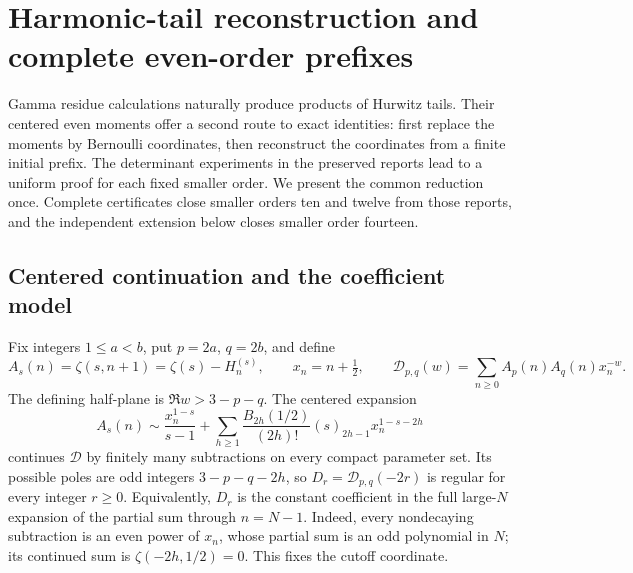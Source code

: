 \section{Harmonic-tail reconstruction and complete even-order prefixes}
\label{opf:section}

Gamma residue calculations naturally produce products of Hurwitz tails.
Their centered even moments offer a second route to exact identities:
first replace the moments by Bernoulli coordinates, then reconstruct the
coordinates from a finite initial prefix. The determinant experiments in
the preserved reports \cite{opf:reports} lead to a uniform proof for each
fixed smaller order. We present the common reduction once. Complete
certificates close smaller orders ten and twelve from those reports,
and the independent extension below closes smaller order fourteen.

\subsection{Centered continuation and the coefficient model}

Fix integers $1\le a<b$, put $p=2a$, $q=2b$, and define
\[
 A_s(n)=\zeta(s,n+1)=\zeta(s)-H_n^{(s)},\qquad x_n=n+\tfrac12,
 \qquad \mathcal D_{p,q}(w)=\sum_{n\ge0}A_p(n)A_q(n)x_n^{-w}.
\]
The defining half-plane is $\Re w>3-p-q$. The centered expansion
\begin{equation}\label{opf:tail-expansion}
 A_s(n)\sim\frac{x_n^{1-s}}{s-1}
 +\sum_{h\ge1}\frac{B_{2h}(1/2)}{(2h)!}(s)_{2h-1}
                                x_n^{1-s-2h}
\end{equation}
continues $\mathcal D$ by finitely many subtractions on every compact
parameter set. Its possible poles are odd integers
$3-p-q-2h$, so $D_r=\mathcal D_{p,q}(-2r)$ is regular for every
integer $r\ge0$. Equivalently, $D_r$ is the constant coefficient in
the full large-$N$ expansion of the partial sum through $n=N-1$.
Indeed, every nondecaying subtraction is an even power of $x_n$,
whose partial sum is an odd polynomial in $N$; its continued sum
is $\zeta(-2h,1/2)=0$. This fixes the cutoff coordinate.

